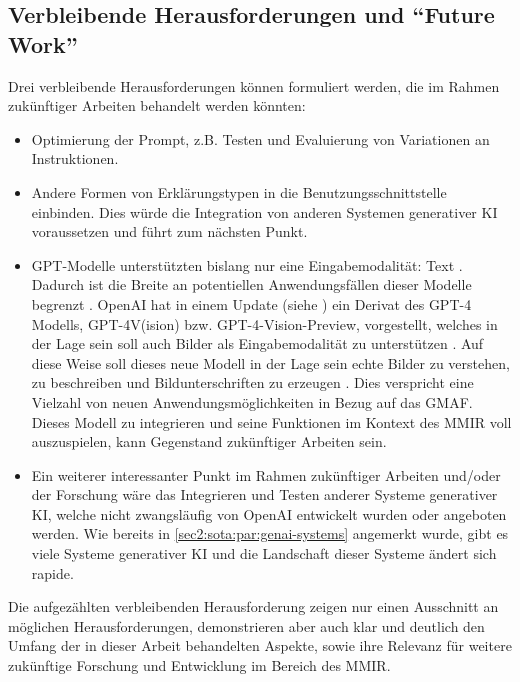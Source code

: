 \subsection{Verbleibende Herausforderungen und \enquote{Future Work}}
\label{sec6:disc:subsec:open-issues-future-work}
Drei verbleibende Herausforderungen können formuliert werden, die im Rahmen zukünftiger Arbeiten behandelt werden könnten:
\begin{itemize}
  \item Optimierung der Prompt, z.B. Testen und Evaluierung von Variationen an Instruktionen.
  \item Andere Formen von Erklärungstypen in die Benutzungsschnittstelle einbinden.
  Dies würde die Integration von anderen Systemen generativer KI voraussetzen und führt zum nächsten Punkt.
  \item GPT-Modelle unterstützten bislang nur eine Eingabemodalität: Text \cite{openai-gpt-4-vision-doc}.
  Dadurch ist die Breite an potentiellen Anwendungsfällen dieser Modelle begrenzt \cite{openai-gpt-4-vision-doc}.
  OpenAI hat in einem Update (siehe \cite{openai-new-update-6_11_23}) ein Derivat des GPT-4 Modells, GPT-4V(ision) bzw. GPT-4-Vision-Preview, vorgestellt, welches in der Lage sein soll auch Bilder als Eingabemodalität zu unterstützen \cite{openai-gpt-4-vision-doc,openai-new-update-6_11_23}.
  Auf diese Weise soll dieses neue Modell in der Lage sein echte Bilder zu verstehen, zu beschreiben und Bildunterschriften zu erzeugen \cite{openai-new-update-6_11_23}.
  Dies verspricht eine Vielzahl von neuen Anwendungsmöglichkeiten in Bezug auf das GMAF.
  Dieses Modell zu integrieren und seine Funktionen im Kontext des MMIR voll auszuspielen, kann Gegenstand zukünftiger Arbeiten sein.
  \item Ein weiterer interessanter Punkt im Rahmen zukünftiger Arbeiten und/oder der Forschung wäre das Integrieren und Testen anderer Systeme generativer KI, welche nicht zwangsläufig von OpenAI entwickelt wurden oder angeboten werden.
  Wie bereits in \cref{sec2:sota:par:genai-systems} angemerkt wurde, gibt es viele Systeme generativer KI und die Landschaft dieser Systeme ändert sich rapide.
\end{itemize}

Die aufgezählten verbleibenden Herausforderung zeigen nur einen Ausschnitt an möglichen Herausforderungen, demonstrieren aber auch klar und deutlich den Umfang der in dieser Arbeit behandelten Aspekte, sowie ihre Relevanz für weitere zukünftige Forschung und Entwicklung im Bereich des MMIR.

